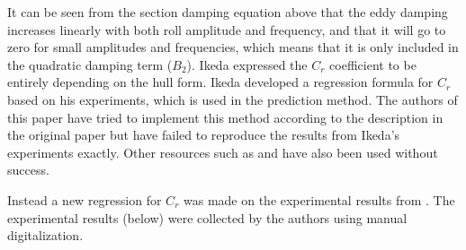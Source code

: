     

    It can be seen from the section damping equation above that the eddy
damping increases linearly with both roll amplitude and frequency, and
that it will go to zero for small amplitudes and frequencies, which
means that it is only included in the quadratic damping term (\(B_2\)).
Ikeda expressed the \(C_r\) coefficient to be entirely depending on the
hull form. Ikeda developed a regression formula for \(C_r\) based on his
experiments, which is used in the prediction method. The authors of this
paper have tried to implement this method according to the description
in the original paper \cite{7505983/4AFVVGNT} but have failed to
reproduce the results from Ikeda's experiments exactly. Other resources
such as \cite{7505983/FB64RGPF} and \cite{7505983/KAKIM2E2} have also
been used without success.

Instead a new regression for \(C_r\) was made on the experimental
results from \cite{7505983/4AFVVGNT}. The experimental results (below)
were collected by the authors using manual digitalization.
 
